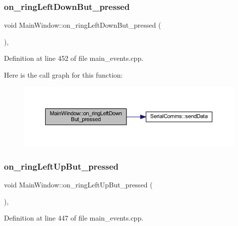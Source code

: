 \subsubsection{\texorpdfstring{on\_ringLeftDownBut\_pressed}{on\_ringLeftDownBut\_pressed}}
{\footnotesize\ttfamily void Main\+Window\+::on\+\_\+ring\+Left\+Down\+But\+\_\+pressed (\begin{DoxyParamCaption}{ }\end{DoxyParamCaption})\hspace{0.3cm}{\ttfamily [private]}, {\ttfamily [slot]}}



Definition at line 452 of file main\+\_\+events.\+cpp.

Here is the call graph for this function\+:
\nopagebreak
\begin{figure}[H]
\begin{center}
\leavevmode
\includegraphics[width=350pt]{classMainWindow_a125980000dd5d0e94dfc612b0d911267_cgraph}
\end{center}
\end{figure}
\mbox{\label{classMainWindow_aefd08ff26ec69cb1a8c2da298e414742}} 
\subsubsection{\texorpdfstring{on\_ringLeftUpBut\_pressed}{on\_ringLeftUpBut\_pressed}}
{\footnotesize\ttfamily void Main\+Window\+::on\+\_\+ring\+Left\+Up\+But\+\_\+pressed (\begin{DoxyParamCaption}{ }\end{DoxyParamCaption})\hspace{0.3cm}{\ttfamily [private]}, {\ttfamily [slot]}}



Definition at line 447 of file main\+\_\+events.\+cpp.

